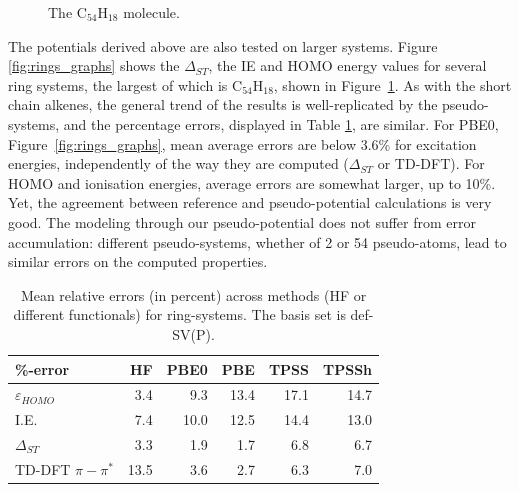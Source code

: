 \documentclass[aip]{revtex4-1}
\begin{document}
\begin{figure}
\begin{center}
\end{center}
\caption{\label{fig:c54h18}The C\(_{54}\)H\(_{18}\) molecule.}
\end{figure}

The potentials derived above are also tested on larger systems.
Figure \ref{fig:rings_graphs} shows the $\Delta_{ST}$, the IE and
HOMO energy values for several ring systems, the largest of which is C$_{54}$H$_{18}$, shown in Figure~\ref{fig:c54h18}.
As with the short chain alkenes, the general trend of the results is well-replicated
by the pseudo-systems, and the percentage errors, displayed in Table
\ref{table:ring_system_errors}, are similar. For PBE0, Figure~\ref{fig:rings_graphs}, mean average errors are below 3.6\% for excitation energies, independently of the way they are computed
($\Delta_{ST}$ or TD-DFT). For HOMO and ionisation energies, average errors are somewhat larger, up to 10\%. 
Yet, the agreement between reference and pseudo-potential calculations is very good.
The modeling through our pseudo-potential does not suffer from error accumulation: different pseudo-systems, whether of 2 or 54 pseudo-atoms, lead to similar errors on the computed properties.

\begin{table}[ht]
\caption{Mean relative errors (in percent) across methods (HF or different functionals)
for ring-systems.
The basis set is def-SV(P).}
\begin{tabular}{l r r r r r }
\hline\hline
\%-error                & HF & PBE0 & PBE & TPSS & TPSSh \\
\hline
$\varepsilon_{HOMO}$    & 3.4 &  9.3  & 13.4 & 17.1 & 14.7 \\
I.E.                    & 7.4 & 10.0  & 12.5 & 14.4 & 13.0 \\
$\Delta_{ST}$           & 3.3 &  1.9  &  1.7 &  6.8 &  6.7 \\
TD-DFT $\pi-\pi^*$       & 13.5 &  3.6  &  2.7 &  6.3 &  7.0 \\ 
\hline\hline
\end{tabular}
\label{table:ring_system_errors}
\end{table}
\end{document}
